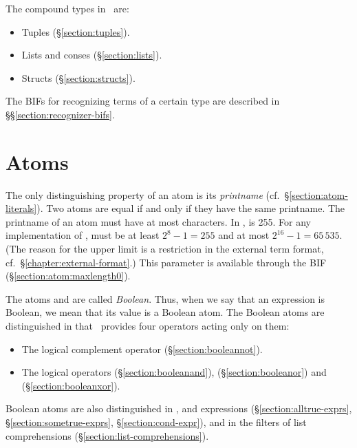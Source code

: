 The compound types in \Erlang\ are:
\begin{itemize}
\item Tuples (\S\ref{section:tuples}).
\item Lists and conses (\S\ref{section:lists}).
\ifstruct
\item Structs (\S\ref{section:structs}).
\fi
\end{itemize}

The BIFs for recognizing terms of a certain type are described in
\S\S\ref{section:recognizer-bifs}.

\section{Atoms}

\label{section:atoms}

The only distinguishing property of an atom is its
\emph{printname}
(cf.~\S\ref{section:atom-literals}).  Two atoms are
equal if and only if they have the same
printname.
The printname of an atom must have at most  characters.
\ifOld
In \OldErlang,  is 255.
\fi
\ifStd
For any implementation of \StdErlang,
 must be at least $2^8-1 = 255$ and at most $2^{16}-1 = 65\,535$.
(The reason for the upper limit is a restriction in the external term format,
cf.~\S\ref{chapter:external-format}.)
This parameter is available through the BIF
 (\S\ref{section:atom:maxlength0}).
\fi
{}

The atoms  and
 are called
\emph{Boolean}.  Thus, when we say that an
expression is Boolean, we mean that its value is a Boolean atom.  The
Boolean atoms are distinguished in that \Erlang\ provides four
operators acting only on them:
\begin{itemize}
\item The logical complement operator  (\S\ref{section:booleannot}).
\item The logical operators  (\S\ref{section:booleanand}), 
(\S\ref{section:booleanor}) and  (\S\ref{section:booleanxor}).
\end{itemize}
Boolean atoms are also distinguished
\ifStd in ,  and 
expressions (\S\ref{section:alltrue-exprs},
\S\ref{section:sometrue-exprs}, \S\ref{section:cond-expr}), and \fi
in the filters of list comprehensions
(\S\ref{section:list-comprehensions}).

